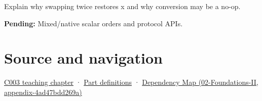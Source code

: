 Explain why swapping twice restores x and why conversion may be a no-op.

\textbf{Pending:} Mixed/native scalar orders and protocol APIs.

\section{Source and navigation}\label{appendix-11ba36693aa2-source-and-navigation}

\href{Continuous\%20Notes/Computing\%20Foundations\%20-\%20From\%20Bits\%20to\%20C++\%20and\%20Systems\%20APIs\#Where\%20the\%20bytes\%20live}{C003 teaching chapter} · \hyperref[appendix-fd090d982a15-m003---parts-41-60]{Part definitions} · \href{../02-Foundations-II/main.pdf\#nameddest=appendix-4ad47bdd269a}{Dependency Map (02-Foundations-II, appendix-4ad47bdd269a)}
